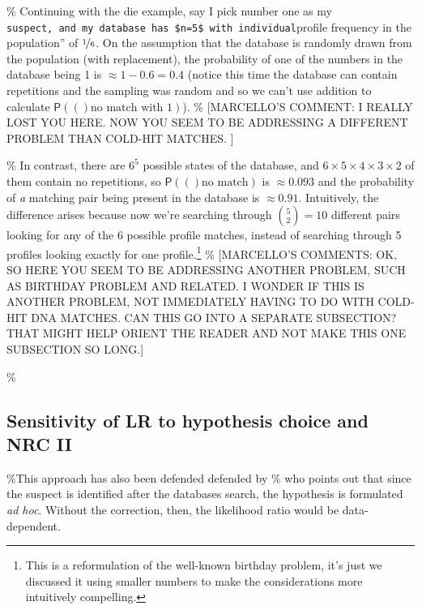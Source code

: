 \documentclass[10pt,dvipsnames,enabledeprecatedfontcommands]{scrartcl}
\newcommand{\pr}[1]{\mathsf{P}(#1)}
\begin{document}
\% Continuing with the die example, say I pick number one as my
\texttt{suspect,\textquotesingle{}\textquotesingle{}\ and\ my\ database\ has\ \$n=5\$\ with\ individual}profile
frequency in the population'' of \(\nicefrac{1}{6}\). On the assumption
that the database is randomly drawn from the population (with
replacement), the probability of one of the numbers in the database
being 1 is \(\approx 1-0.6=0.4\) (notice this time the database can
contain repetitions and the sampling was random and so we can't use
addition to calculate \(\pr(\textrm{no match with 1})\)). \%
{[}MARCELLO'S COMMENT: I REALLY LOST YOU HERE. NOW YOU SEEM TO BE
ADDRESSING A DIFFERENT PROBLEM THAN COLD-HIT MATCHES. {]}

\% In contrast, there are \(6^5\) possible states of the database, and
\(6\times 5 \times 4\times 3 \times 2\) of them contain no repetitions,
so \(\pr(\textrm{no match})\) is \(\approx 0.093\) and the probability
of \emph{a} matching pair being present in the database is
\(\approx 0.91\). Intuitively, the difference arises because now we're
searching through \({ 5 \choose 2}=10\) different pairs looking for any
of the 6 possible profile matches, instead of searching through 5
profiles looking exactly for one
profile.\footnote{This is  a reformulation of the well-known birthday problem, it's just we discussed it using smaller numbers to make the considerations more intuitively compelling.}
\% {[}MARCELLO'S COMMENTS: OK, SO HERE YOU SEEM TO BE ADDRESSING ANOTHER
PROBLEM, SUCH AS BIRTHDAY PROBLEM AND RELATED. I WONDER IF THIS IS
ANOTHER PROBLEM, NOT IMMEDIATELY HAVING TO DO WITH COLD-HIT DNA MATCHES.
CAN THIS GO INTO A SEPARATE SUBSECTION? THAT MIGHT HELP ORIENT THE
READER AND NOT MAKE THIS ONE SUBSECTION SO LONG.{]}

\%\subsection{Sensitivity of LR to hypothesis choice and NRC II} \label{subsec:LRandDNA}

\%This approach has also been defended defended by
\%\citet{stockmarr1999LikelihoodRatiosEvaluating} who points out that
since the suspect is identified after the databases search, the
hypothesis is formulated \textit{ad hoc}. Without the correction, then,
the likelihood ratio would be data-dependent.
\end{document}
